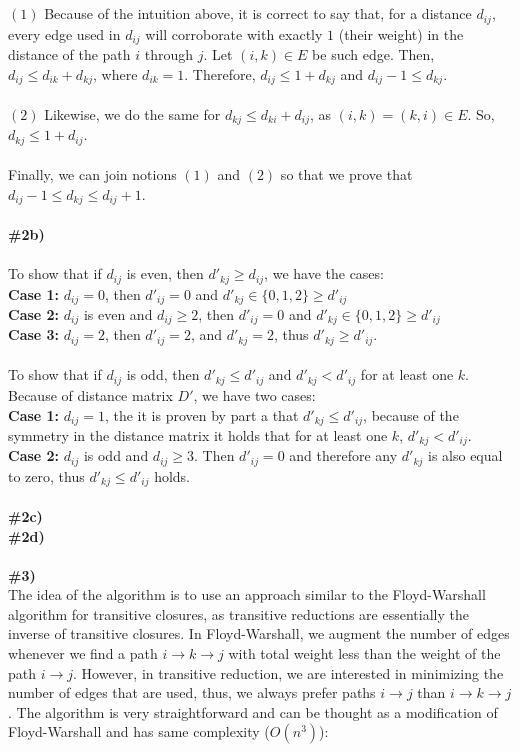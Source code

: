 \documentclass{article}
\begin{document}
\\
\\
$(1)$ Because of the intuition above, it is correct to say that, for a distance $d_{ij}$, every edge used in $d_{ij}$ will corroborate with exactly $1$ (their weight) in the distance of the path $i$ through $j$. Let $(i, k) \in E$ be such edge. Then, $d_{ij} \leq d_{ik} + d_{kj}$, where $d_{ik} = 1$. Therefore, $d_{ij} \leq 1 + d_{kj}$ and $d_{ij} - 1 \leq d_{kj}$.
\\
\\
$(2)$ Likewise, we do the same for $d_{kj} \leq d_{ki} + d_{ij}$, as $(i, k) = (k, i) \in E$. So, $d_{kj} \leq 1 + d_{ij}$.
\\
\\
Finally, we can join notions $(1)$ and $(2)$ so that we prove that $d_{ij} -1 \leq d_{kj} \leq d_{ij} + 1$.
\\
\\
\textbf{\#2b)}
\\
\\
To show that if $d_{ij}$ is even, then $d'_{kj} \geq d_{ij}$, we have the cases:
\\
\textbf{Case 1:} $d_{ij} = 0$, then $d'_{ij} = 0$ and $d'_{kj} \in \{ 0, 1, 2 \} \geq d'_{ij}$\\
\textbf{Case 2:} $d_{ij}$ is even and $d_{ij} \geq 2$, then $d'_{ij} = 0$ and $d'_{kj} \in \{ 0, 1, 2 \} \geq d'_{ij}$
\\
\textbf{Case 3:} $d_{ij} = 2$, then $d'_{ij} = 2$, and $d'_{kj} = 2$, thus $d'_{kj} \geq d'_{ij}$.
\\
\\
To show that if $d_{ij}$ is odd, then $d'_{kj} \leq d'_{ij}$ and $d'_{kj} < d'_{ij}$ for at least one $k$. Because of distance matrix $D'$, we have two cases:\\
\textbf{Case 1:} $d_{ij} = 1$, the it is proven by part a that $d'_{kj} \leq d'_{ij}$, because of the symmetry in the distance matrix it holds that for at least one $k$, $d'_{kj} < d'_{ij}$.\\
\textbf{Case 2:} $d_{ij}$ is odd and $d_{ij} \geq 3$. Then $d'_{ij} = 0$ and therefore any $d'_{kj}$ is also equal to zero, thus $d'_{kj} \leq d'_{ij}$ holds.\\
\\
\textbf{\#2c)}\\
\textbf{\#2d)}\\
\\
\textbf{\#3)}
\\
The idea of the algorithm is to use an approach similar to the Floyd-Warshall algorithm for transitive closures, as transitive reductions are essentially the inverse of transitive closures. In Floyd-Warshall, we augment the number of edges whenever we find a path $i \rightarrow k \rightarrow j$ with total weight less than the weight of the path $i \rightarrow j$. However, in transitive reduction, we are interested in minimizing the number of edges that are used, thus, we always prefer paths $i \rightarrow j$ than $i \rightarrow k \rightarrow j$. The algorithm is very straightforward and can be thought as a modification of Floyd-Warshall and has same complexity ($O(n^3)$):
\end{document}
